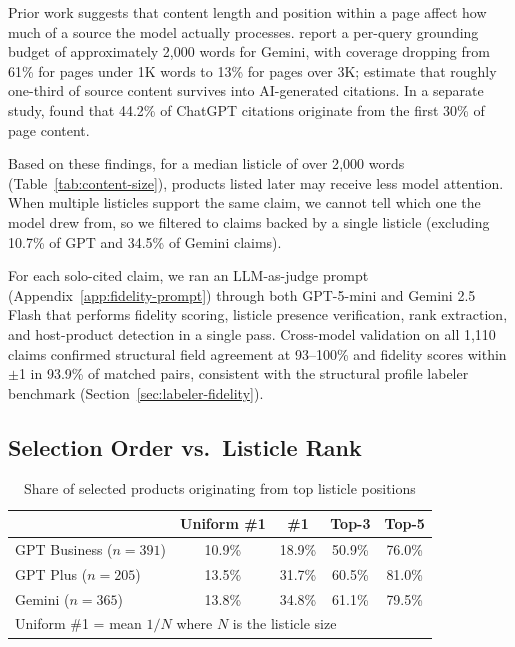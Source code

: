 Prior work suggests that content length and position within a page affect how much of a source the model actually processes. \textcite{petrovic2025grounding} report a per-query grounding budget of approximately 2{,}000 words for Gemini, with coverage dropping from 61\% for pages under 1K words to 13\% for pages over 3K; \textcite{petrovic2025filter} estimate that roughly one-third of source content survives into AI-generated citations. In a separate study, \textcite{indig2026attention} found that 44.2\% of ChatGPT citations originate from the first 30\% of page content.

Based on these findings, for a median listicle of over 2{,}000 words (Table~\ref{tab:content-size}), products listed later may receive less model attention. 
When multiple listicles support the same claim, we cannot tell which one the model drew from, so we filtered to claims backed by a single listicle (excluding 10.7\% of GPT and 34.5\% of Gemini claims).
\label{sec:solo-cited}

For each solo-cited claim, we ran an LLM-as-judge prompt (Appendix~\ref{app:fidelity-prompt}) through both GPT-5-mini and Gemini 2.5 Flash that performs fidelity scoring, listicle presence verification, rank extraction, and host-product detection in a single pass. Cross-model validation on all 1{,}110 claims confirmed structural field agreement at 93--100\% and fidelity scores within $\pm$1 in 93.9\% of matched pairs, consistent with the structural profile labeler benchmark (Section~\ref{sec:labeler-fidelity}).

\subsection{Selection Order vs.\ Listicle Rank}
\label{sec:reranking}

\begin{table}[H]
\centering
\caption{Share of selected products originating from top listicle positions}
\label{tab:listicle-rank-bias}
\begin{tabular}{l cccc}
\toprule
& Uniform \#1 & \#1 & Top-3 & Top-5 \\
\midrule
GPT Business ($n{=}391$) & 10.9\% & 18.9\% & 50.9\% & 76.0\% \\
GPT Plus ($n{=}205$) & 13.5\% & 31.7\% & 60.5\% & 81.0\% \\
Gemini ($n{=}365$) & 13.8\% & 34.8\% & 61.1\% & 79.5\% \\
\bottomrule
\multicolumn{5}{l}{\scriptsize Uniform \#1 = mean $1/N$ where $N$ is the listicle size}
\end{tabular}
\end{table}

